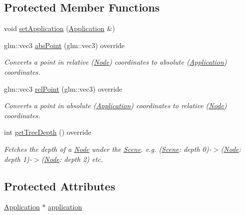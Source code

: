 \subsection*{Protected Member Functions}
\begin{DoxyCompactItemize}
\item 
void \mbox{\hyperlink{classsage_1_1Scene_a358126a7522477066667d48787ac3176}{set\+Application}} (\mbox{\hyperlink{classsage_1_1Application}{Application}} \&)
\item 
glm\+::vec3 \mbox{\hyperlink{classsage_1_1Scene_a7d445c207e9b3d978c8a47ceacd10b24}{abs\+Point}} (glm\+::vec3) override
\begin{DoxyCompactList}\small\item\em Converts a point in relative (\mbox{\hyperlink{classsage_1_1Node}{Node}}) coordinates to absolute (\mbox{\hyperlink{classsage_1_1Application}{Application}}) coordinates. \end{DoxyCompactList}\item 
glm\+::vec3 \mbox{\hyperlink{classsage_1_1Scene_ae68e14c0f453db078df4b515fdea83f7}{rel\+Point}} (glm\+::vec3) override
\begin{DoxyCompactList}\small\item\em Converts a point in absolute (\mbox{\hyperlink{classsage_1_1Application}{Application}}) coordinates to relative (\mbox{\hyperlink{classsage_1_1Node}{Node}}) coordinates. \end{DoxyCompactList}\item 
int \mbox{\hyperlink{classsage_1_1Scene_ae1a853d0cba5d20d1f25b05c9a3f89d1}{get\+Tree\+Depth}} () override
\begin{DoxyCompactList}\small\item\em Fetches the depth of a \mbox{\hyperlink{classsage_1_1Node}{Node}} under the \mbox{\hyperlink{classsage_1_1Scene}{Scene}}. e.\+g. (\mbox{\hyperlink{classsage_1_1Scene}{Scene}}\+: depth 0)-\/$>$(\mbox{\hyperlink{classsage_1_1Node}{Node}}\+: depth 1)-\/$>$(\mbox{\hyperlink{classsage_1_1Node}{Node}}\+: depth 2) etc. \end{DoxyCompactList}\end{DoxyCompactItemize}
\subsection*{Protected Attributes}
\begin{DoxyCompactItemize}
\item 
\mbox{\hyperlink{classsage_1_1Application}{Application}} $\ast$ \mbox{\hyperlink{classsage_1_1Scene_a06046ccc778f9e7257e777c048c481b9}{application}}
\end{DoxyCompactItemize}
